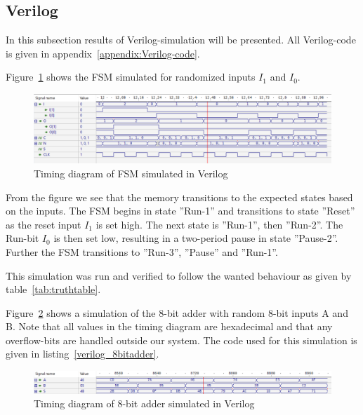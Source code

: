 \subsection{Verilog}

In this subsection results of Verilog-simulation will be presented. All Verilog-code is given in appendix~\ref{appendix:Verilog-code}.

Figure~\ref{fig:fsm_simulation} shows the FSM simulated for randomized inputs $I_1$ and $I_0$.

\begin{figure}[H]
    \centering
    \includegraphics[width=\textwidth]{Figures/Test of FSM.png}
    \caption{Timing diagram of FSM simulated in Verilog}
    \label{fig:fsm_simulation}
\end{figure}

From the figure we see that the memory transitions to the expected states based on the inputs. The FSM begins in state ''Run-1'' and transitions to state ''Reset'' as the reset input $I_1$ is set high. The next state is ''Run-1'', then ''Run-2''. The Run-bit $I_0$ is then set low, resulting in a two-period pause in state ''Pause-2''. Further the FSM transitions to ''Run-3'', ''Pause'' and ''Run-1''.

This simulation was run and verified to follow the wanted behaviour as given by table~\ref{tab:truthtable}.

Figure~\ref{fig:eightbitadder_sim} shows a simulation of the 8-bit adder with random 8-bit inputs A and B. Note that all values in the timing diagram are hexadecimal and that any overflow-bits are handled outside our system. The code used for this simulation is given in listing~\ref{verilog_8bitadder}.

\begin{figure}[H]
    \centering
    \includegraphics[width=\textwidth]{Figures/Test of eightbitadder.png}
    \caption{Timing diagram of 8-bit adder simulated in Verilog}
    \label{fig:eightbitadder_sim}
\end{figure}

